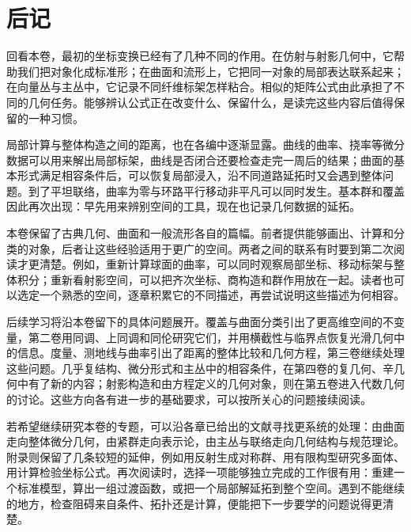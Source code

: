 \chapter*{后记}
回看本卷，最初的坐标变换已经有了几种不同的作用。在仿射与射影几何中，它帮助我们把对象化成标准形；在曲面和流形上，它把同一对象的局部表达联系起来；在向量丛与主丛中，它记录不同纤维标架怎样粘合。相似的矩阵公式由此承担了不同的几何任务。能够辨认公式正在改变什么、保留什么，是读完这些内容后值得保留的一种习惯。

\ProseParagraphBreak

局部计算与整体构造之间的距离，也在各编中逐渐显露。曲线的曲率、挠率等微分数据可以用来解出局部标架，曲线是否闭合还要检查走完一周后的结果；曲面的基本形式满足相容条件后，可以恢复局部浸入，沿不同道路延拓时又会遇到整体问题。到了平坦联络，曲率为零与环路平行移动非平凡可以同时发生。基本群和覆盖因此再次出现：早先用来辨别空间的工具，现在也记录几何数据的延拓。

\ProseParagraphBreak

本卷保留了古典几何、曲面和一般流形各自的篇幅。前者提供能够画出、计算和分类的对象，后者让这些经验适用于更广的空间。两者之间的联系有时要到第二次阅读才更清楚。例如，重新计算球面的曲率，可以同时观察局部坐标、移动标架与整体积分；重新看射影空间，可以把齐次坐标、商构造和群作用放在一起。读者也可以选定一个熟悉的空间，逐章积累它的不同描述，再尝试说明这些描述为何相容。

\ProseParagraphBreak

后续学习将沿本卷留下的具体问题展开。覆盖与曲面分类引出了更高维空间的不变量，第二卷用同调、上同调和同伦研究它们，并用横截性与临界点恢复光滑几何中的信息。度量、测地线与曲率引出了距离的整体比较和几何方程，第三卷继续处理这些问题。几乎复结构、微分形式和主丛中的相容条件，在第四卷的复几何、辛几何中有了新的内容；射影构造和由方程定义的几何对象，则在第五卷进入代数几何的讨论。这些方向各有进一步的基础要求，可以按所关心的问题接续阅读。

\ProseParagraphBreak

若希望继续研究本卷的专题，可以沿各章已给出的文献寻找更系统的处理：由曲面走向整体微分几何，由紧群走向表示论，由主丛与联络走向几何结构与规范理论。附录则保留了几条较短的延伸，例如用反射生成对称群、用有限构型研究多面体、用计算检验坐标公式。再次阅读时，选择一项能够独立完成的工作很有用：重建一个标准模型，算出一组过渡函数，或把一个局部解延拓到整个空间。遇到不能继续的地方，检查阻碍来自条件、拓扑还是计算，便能把下一步要学的问题说得更清楚。

